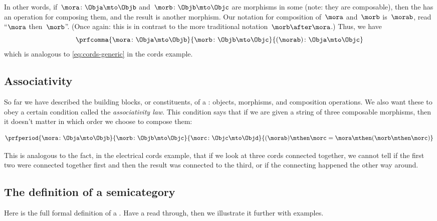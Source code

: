In other words, if~$\mora\colon \Obja \mto \Objb$ and~$\morb\colon \Objb \mto \Objc$ are morphisms in some  (note: they are composable), then the  has an operation for composing them, and the result is another morphism.
Our notation for composition of~$\mora$ and~$\morb$ is~$\morab$, read ``$\mora$ then~$\morb$''.
(Once again: this is in contrast to the more traditional notation~$\morb \after \mora$.)
Thus, we have
\begin{equation}
    \prfcomma{
        \mora \colon \Obja \mto \Objb
    }{
        \morb\colon \Objb \mto \Objc
    }{
        (\morab )\colon \Obja \mto \Objc
    }
\end{equation}
which is analogous to \cref{eq:cords-generic} in the cords example.

\subsection{Associativity}

So far we have described the building blocks, or constituents, of a : objects, morphisms, and composition operations.
We also want these to obey a certain condition called the \emph{associativity law}.
This condition says that if we are given a string of three composable morphisms, then it doesn't matter in which order we choose to compose them:

\begin{equation}
    \prfperiod{
        \mora \colon \Obja \mto \Objb
    }{
        \morb\colon \Objb \mto \Objc
    }{
        \morc \colon \Objc \mto \Objd
    }{
        (\morab ) \mthen \morc = \mora \mthen ( \morb  \mthen \morc )
    }
\end{equation}

This is analogous to the fact, in the electrical cords example, that if we look at three cords connected together, we cannot tell if the first two were connected together first and then the result was connected to the third, or if the connecting happened the other way around.

\subsection{The definition of a semicategory}

Here is the full formal definition of a .
Have a read through, then we illustrate it further with examples.

